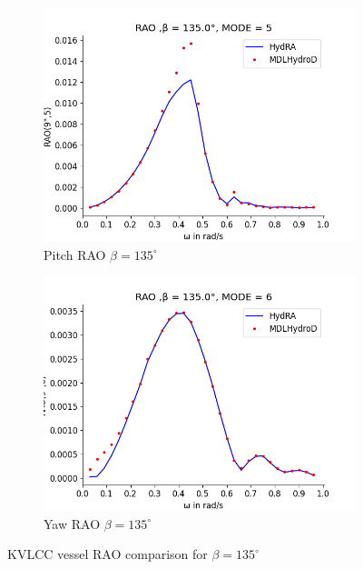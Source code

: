 \begin{figure}[H]
\begin{subfigure}[b]{0.49\textwidth}
        \includegraphics[width=\textwidth]{plots/kvlcc/rao2/rao5.png}
        \caption{Pitch RAO $\beta = 135^{\circ}$}
    \end{subfigure}
    \begin{subfigure}[b]{0.49\textwidth}
        \includegraphics[width=\textwidth]{plots/kvlcc/rao2/rao6.png}
        \caption{Yaw RAO $\beta = 135^{\circ}$}
    \end{subfigure}
    \caption{KVLCC vessel RAO comparison for $\beta= 135^{\circ}$}
    \label{fig:kvlcc_rao_135}
\end{figure}

\newpage
